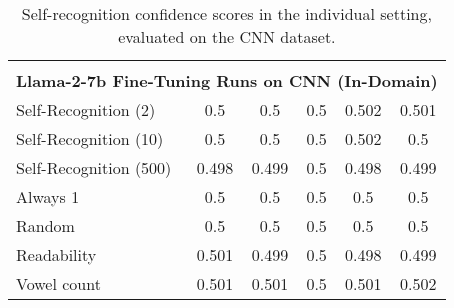 \begin{table}[h]
\begin{tabular}{l|ccccc}
        \multicolumn{6}{c}{} \\
        \multicolumn{6}{c}{\textbf{Llama-2-7b Fine-Tuning Runs on CNN (In-Domain)}} \\
        Self-Recognition (2)                       & 0.5         & 0.5         & 0.5         & 0.502       & 0.501       \\
        Self-Recognition (10)                      & 0.5         & 0.5         & 0.5         & 0.502       & 0.5         \\
        Self-Recognition (500)                     & 0.498       & 0.499       & 0.5         & 0.498       & 0.499       \\
        Always 1                           & 0.5         & 0.5         & 0.5         & 0.5         & 0.5         \\
        Random                             & 0.5         & 0.5         & 0.5         & 0.5         & 0.5         \\
        Readability                        & 0.501       & 0.499       & 0.5         & 0.498       & 0.499       \\
        Vowel count                        & 0.501       & 0.501       & 0.5         & 0.501       & 0.502       \\
    \end{tabular}
    \caption{Self-recognition confidence scores in the individual setting, evaluated on the CNN dataset.}
    \label{table:individual_self_pref_cnn}
\end{table}